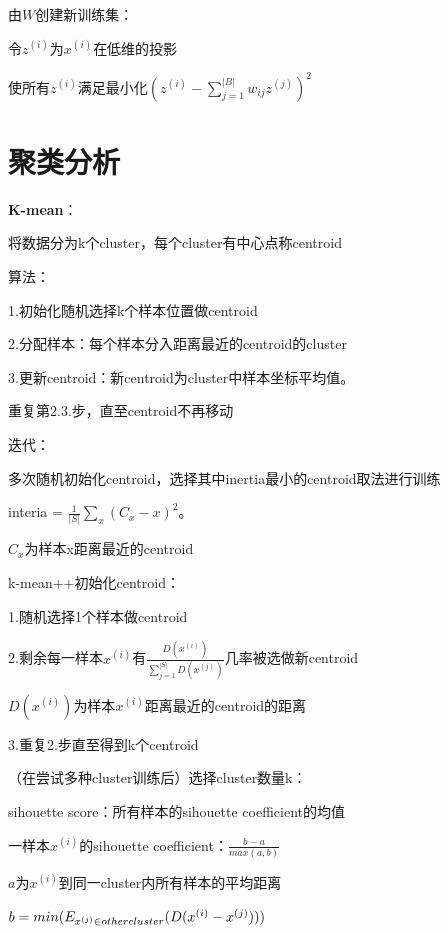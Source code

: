 \documentclass[UTF8]{ctexart}
\begin{document}
  由$W$创建新训练集：

  \quad 令$z^{(i)}$为$x^{(i)}$在低维的投影

  \quad 使所有$z^{(i)}$满足最小化$(z^{(i)} - \sum_{j=1}^{|B|}w_{ij}z^{(j)})^2$

\section{聚类分析}
\noindent \textbf{K-mean}：

  将数据分为k个cluster，每个cluster有中心点称centroid
  
  算法：
  
  \quad 1.初始化随机选择k个样本位置做centroid

  \quad 2.分配样本：每个样本分入距离最近的centroid的cluster

  \quad 3.更新centroid：新centroid为cluster中样本坐标平均值。
  
  \quad 重复第2.3.步，直至centroid不再移动

  迭代：
  
  \quad 多次随机初始化centroid，选择其中inertia最小的centroid取法进行训练

  \quad \quad interia = $\frac{1}{|S|}\sum_x (C_x - x)^2$。

  \quad \quad \quad $C_x$为样本x距离最近的centroid

  \quad k-mean++初始化centroid：

  \quad \quad 1.随机选择1个样本做centroid

  \quad \quad 2.剩余每一样本$x^{(i)}$有$\frac{D(x^{(i)})}{\sum_{j=1}^{|S|} D(x^{(j)})}$几率被选做新centroid

  \quad \quad \quad $D(x^{(i)})$为样本$x^{(i)}$距离最近的centroid的距离

  \quad \quad 3.重复2.步直至得到k个centroid

  \quad （在尝试多种cluster训练后）选择cluster数量k：

  \quad \quad sihouette score：所有样本的sihouette coefficient的均值

  \quad \quad \quad 一样本$x^{(i)}$的sihouette coefficient：$\frac{b-a}{max(a, b)}$

  \quad \quad \quad \quad $a$为$x^{(i)}$到同一cluster内所有样本的平均距离
  
  \quad \quad \quad \quad $b = min(E_{x^{(j)} \in other \space cluster}(D(x^{(i)} - x^{(j)})))$
\end{document}
